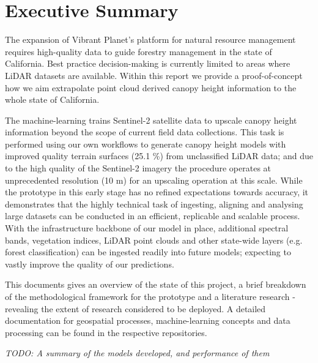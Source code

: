 \section*{Executive Summary}

The expansion of Vibrant Planet's platform for natural resource management requires high-quality data to guide forestry management in the state of California. Best practice decision-making is currently limited to areas where LiDAR datasets are available. Within this report we provide a proof-of-concept how we aim extrapolate point cloud derived canopy height information to the whole state of California.

 The machine-learning trains Sentinel-2 satellite data to upscale canopy height information beyond the scope of current field data collections. This task is performed using our own workflows to generate canopy height models with improved quality terrain surfaces (25.1 \%) from unclassified LiDAR data; and due to the high quality of the Sentinel-2 imagery the procedure operates at unprecedented resolution (10 m) for an upscaling operation at this scale.  While the prototype in this early stage has no refined expectations towards accuracy, it demonstrates that the highly technical task of ingesting, aligning and analysing large datasets can be conducted in an efficient, replicable and scalable process. With the infrastructure backbone of our model in place, additional spectral bands, vegetation indices, LiDAR point clouds and other state-wide layers (e.g. forest classification) can be ingested readily into future models; expecting to vastly improve the quality of our predictions.

This documents gives an overview of the state of this project, a brief breakdown of the methodological framework for the prototype and a literature research - revealing the extent of research considered to be deployed. A detailed documentation for geospatial processes, machine-learning concepts and data processing can be found in the respective repositories.

\emph{TODO: A summary of the models developed, and performance of them}
